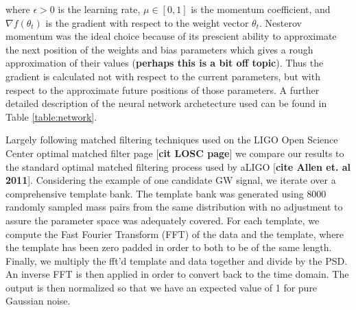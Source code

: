 \documentclass[%
 amsmath,amssymb,
 aps,
 twocolumn,
floatfix,
]{revtex4-1}
\begin{document}
where $\epsilon > 0$ is the learning rate, $\mu \in [0,1]$ is the momentum coefficient, and $\nabla f(\theta_{t})$ is the gradient with respect to the weight vector $\theta_{t}$. Nesterov momentum was the ideal choice because of its prescient ability to approximate the next position of the weights and bias parameters which gives a rough approximation of their values (\textbf{perhaps this is a bit off topic}). Thus the gradient is calculated not with respect to the current parameters, but with respect to the approximate future positions of those parameters. A further detailed description of the neural network archetecture used can be found in Table \ref{table:network}.

Largely following matched filtering techniques used on the LIGO Open Science Center optimal matched filter page [\textbf{cit LOSC page}] we compare our results to the standard optimal matched filtering process used by aLIGO [\textbf{cite Allen et. al 2011}]. Considering the example of one candidate GW signal, we iterate over a comprehensive template bank. The template bank was generated using 8000 randomly sampled mass pairs from the same distribution with no adjustment to assure the parameter space was adequately covered. For each template, we compute the Fast Fourier Transform (FFT) of the data and the template, where the template has been zero padded in order to both to be of the same length. Finally, we multiply the fft'd template and data together and divide by the PSD. An inverse FFT is then applied in order to convert back to the time domain. The output is then normalized so that we have an expected value of 1 for pure Gaussian noise.
\end{document}
